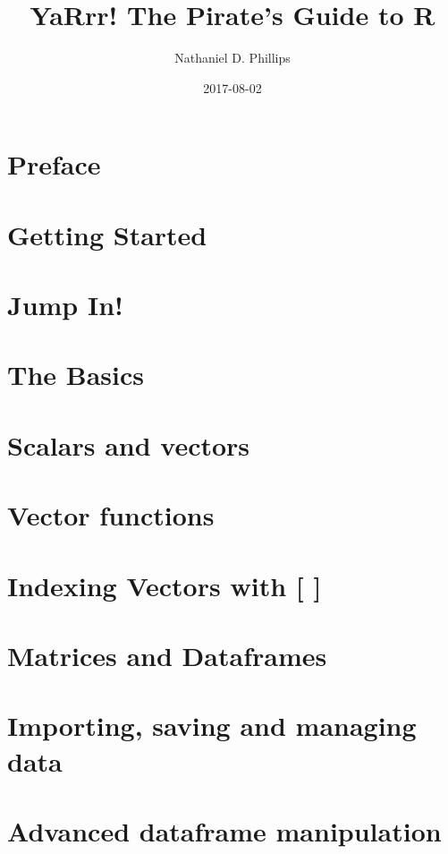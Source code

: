 \documentclass[]{book}
\title{YaRrr! The Pirate's Guide to R}
\author{Nathaniel D. Phillips}
\date{2017-08-02}
\theoremstyle{definition}
\theoremstyle{definition}
\theoremstyle{remark}
\begin{document}
\maketitle

{
\setcounter{tocdepth}{1}
\tableofcontents
}
\chapter{Preface}\label{intro}

\chapter{Getting Started}\label{started}

\chapter{Jump In!}\label{jumpin}

\chapter{The Basics}\label{basics}

\chapter{Scalars and vectors}\label{scalersvectors}

\chapter{Vector functions}\label{vectorfunctions}

\chapter{Indexing Vectors with {[} {]}}\label{vectorindexing}

\chapter{Matrices and Dataframes}\label{matricesdataframes}

\chapter{Importing, saving and managing data}\label{importingdata}

\chapter{Advanced dataframe manipulation}\label{advanceddataframe}
\end{document}
